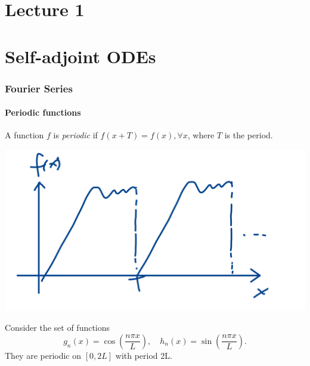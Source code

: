 \documentclass[a4paper]{article}
\begin{document}
\maketitle
\tableofcontents
\newpage
\part*{Lecture 1}
\part{Self-adjoint ODEs}
\section{Fourier Series}
\subsection{Periodic functions}
\begin{definition}
    A function $f$ is \textit{periodic} if $ f(x+T)=f(x), \forall x $, where $T$ is the period.
\end{definition}
\begin{center}
    \includegraphics[scale=0.1]{methods1.jpeg}
\end{center}
Consider the set of functions 
\[
    g_n(x) = \cos \left( \frac{n\pi x}{L} \right),\quad h_n(x) = \sin \left( \frac{n\pi x}{L} \right).
\]
They are periodic on $ [0,2L] $ with period 2L.
\end{document}
